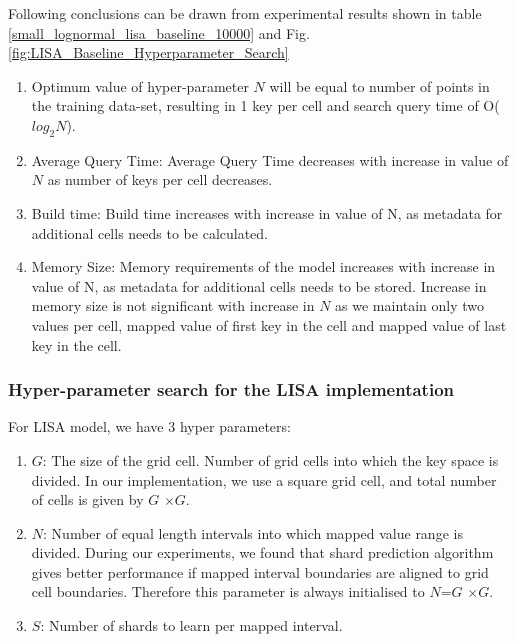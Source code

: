 \begin{mscconclusion}
	Following conclusions can be drawn from experimental results shown in table \ref{small_lognormal_lisa_baseline_10000} and Fig. \ref{fig:LISA_Baseline_Hyperparameter_Search}
\begin{enumerate}
    \item Optimum value of hyper-parameter $N$ will be equal to number of points in the training data-set, resulting in 1 key per cell and search query time of O($log_{2}N$).
	
	\item Average Query Time:  Average Query Time decreases with increase in value of $N$ as number of keys per cell decreases.
	\item Build time: Build time increases with increase in value of N, as metadata for additional cells needs to be calculated. 
	\item Memory Size:  Memory requirements of the model increases with increase in value of N, as metadata for additional cells needs to be stored. Increase  in memory size is not significant with increase in $N$ as we maintain only two values per cell, mapped value of first key in the cell and mapped value of last key in the cell.
\end{enumerate}
\end{mscconclusion}

\subsubsection {Hyper-parameter search for the LISA implementation}
For LISA model, we have 3 hyper parameters:
\begin{enumerate}
	\item $G$: The size of the grid cell. Number of grid cells into which the key space is divided. In our implementation, we use a square grid cell, and total number of cells is given by $G$ $\times G$.
	\item $N$: Number of equal length intervals into which mapped value range is divided. During our experiments, we found that shard prediction algorithm gives better performance if mapped interval boundaries are aligned to grid cell boundaries. Therefore this parameter is always initialised to $N$=$G$ $\times G$.
	\item $S$: Number of shards to learn per mapped interval. 
\end{enumerate}

